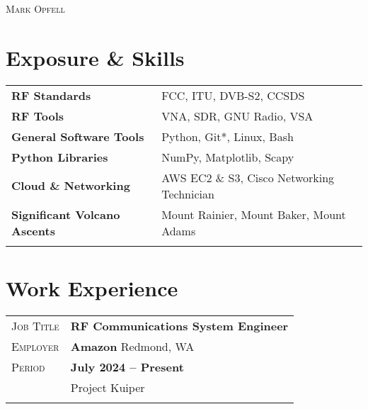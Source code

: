 \documentclass[a4paper, oneside, final]{scrartcl}
\newcommand{\gray}{\rowcolor[gray]{.90}} %
\begin{document}
\begin{center} %

\pdfpageheight 11in 
\pdfpagewidth 8.5in


{\fontsize{36}{36}\selectfont\scshape Mark Opfell} 
\vspace{1.16 cm} %


\section{Exposure \& Skills}
\begin{tabular}{ @{} >{\bfseries}l @{\hspace{6ex}} l }
RF Standards & FCC, ITU, DVB-S2, CCSDS \\
RF Tools & VNA, SDR, GNU Radio, VSA\\%
General Software Tools & Python, Git*, Linux, Bash\\%
Python Libraries & NumPy, Matplotlib, Scapy\\%
Cloud \& Networking & AWS EC2 \& S3, Cisco Networking Technician\\ %
Significant Volcano Ascents & Mount Rainier, Mount Baker, Mount Adams \\%
\\
\end{tabular}

\section{Work Experience}

\begin{tabularx}{0.97\linewidth}{>{\raggedleft\scshape}p{2cm}X}
\gray Job Title & \textbf{RF Communications System Engineer}\\
\gray Employer & \textbf{Amazon} \hfill Redmond, WA\\
\gray Period & \textbf{July 2024 -- Present}\\
&
\vspace{-0.15 cm}
Project Kuiper
\\
\\
\end{tabularx}


\end{center}
\end{document}
